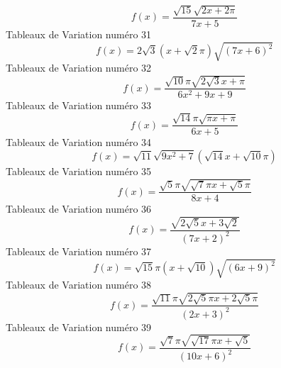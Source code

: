 \documentclass{article}
\begin{document}
\[f(x) = \frac{\sqrt{15} \sqrt{2 x + 2 \pi}}{7 x + 5}\]Tableaux de Variation num\'ero 31 \[f(x) = 2 \sqrt{3} \left(x + \sqrt{2} \pi\right) \sqrt{\left(7 x + 6\right)^{2}}\]Tableaux de Variation num\'ero 32 \[f(x) = \frac{\sqrt{10} \pi \sqrt{2 \sqrt{3} x + \pi}}{6 x^{2} + 9 x + 9}\]Tableaux de Variation num\'ero 33 \[f(x) = \frac{\sqrt{14} \pi \sqrt{\pi x + \pi}}{6 x + 5}\]Tableaux de Variation num\'ero 34 \[f(x) = \sqrt{11} \sqrt{9 x^{2} + 7} \left(\sqrt{14} x + \sqrt{10} \pi\right)\]Tableaux de Variation num\'ero 35 \[f(x) = \frac{\sqrt{5} \pi \sqrt{\sqrt{7} \pi x + \sqrt{5} \pi}}{8 x + 4}\]Tableaux de Variation num\'ero 36 \[f(x) = \frac{\sqrt{2 \sqrt{5} x + 3 \sqrt{2}}}{\left(7 x + 2\right)^{2}}\]Tableaux de Variation num\'ero 37 \[f(x) = \sqrt{15} \pi \left(x + \sqrt{10}\right) \sqrt{\left(6 x + 9\right)^{2}}\]Tableaux de Variation num\'ero 38 \[f(x) = \frac{\sqrt{11} \pi \sqrt{2 \sqrt{5} \pi x + 2 \sqrt{5} \pi}}{\left(2 x + 3\right)^{2}}\]Tableaux de Variation num\'ero 39 \[f(x) = \frac{\sqrt{7} \pi \sqrt{\sqrt{17} \pi x + \sqrt{5}}}{\left(10 x + 6\right)^{2}}\]
\end{document}
